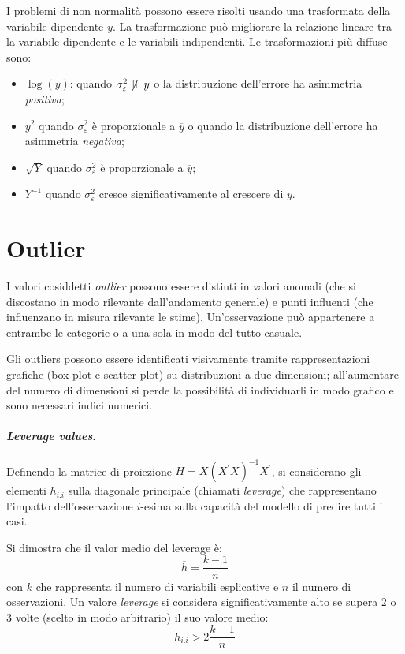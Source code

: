 \documentclass[a4page, 11pt]{article} %
\def\dep{\not\!\perp\!\!\!\perp}  %
\begin{document}
I problemi di non normalità possono essere risolti usando una trasformata della variabile dipendente $y$.
La trasformazione può migliorare la relazione lineare tra la variabile dipendente e le variabili indipendenti.
Le trasformazioni più diffuse sono:
\begin{itemize}[noitemsep]
  \item $\log(y)$: quando $\sigma^2_\varepsilon \dep y$ o la distribuzione dell'errore ha asimmetria \textit{positiva};
  \item $y^2$ quando $\sigma^2_\varepsilon$ è proporzionale a $\overline{y}$ o quando la distribuzione dell'errore ha asimmetria \textit{negativa};
  \item $\sqrt{Y}$ quando $\sigma^2_\varepsilon$ è proporzionale a $\overline{y}$;
  \item $Y^{-1}$ quando $\sigma^2_\varepsilon$ cresce significativamente al crescere di $y$.
\end{itemize}

\section{Outlier}
I valori cosiddetti \textit{outlier} possono essere distinti in valori anomali (che si discostano in modo rilevante dall’andamento generale) e punti influenti (che influenzano in misura rilevante le stime).
Un'osservazione può appartenere a entrambe le categorie o a una sola in modo del tutto casuale.

Gli outliers possono essere identificati visivamente tramite rappresentazioni grafiche (box-plot e scatter-plot) su distribuzioni a due dimensioni; all'aumentare del numero di dimensioni si perde la possibilità di individuarli in modo grafico e sono necessari indici numerici.

\paragraph{\textit{Leverage values}.} Definendo la matrice di proiezione $H = X(X^{\prime}X)^{-1}X^\prime$, si considerano gli elementi $h_{i.i}$ sulla diagonale principale (chiamati \textit{leverage}) che rappresentano l'impatto dell'osservazione $i$-esima sulla capacità del modello di predire tutti i casi.

Si dimostra che il valor medio del leverage è:
\begin{equation*} 
\overline{h} = \frac{k - 1}{n}
\end{equation*}
con $k$ che rappresenta il numero di variabili esplicative e $n$ il numero di osservazioni.
Un valore \textit{leverage} si considera significativamente alto se supera $2$ o $3$ volte (scelto in modo arbitrario) il suo valore medio:
\begin{equation*}
h_{i.i} > 2\frac{k - 1}{n}
\end{equation*}
\end{document}
